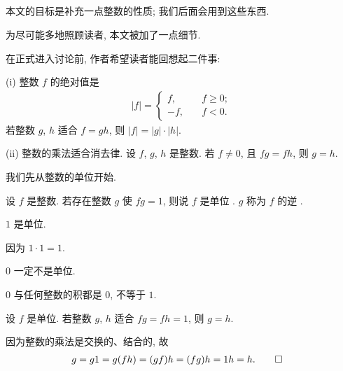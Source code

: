 \subsection*{\SomePropertiesOfIntegers}
\markright{\SomePropertiesOfIntegers}

本文的目标是补充一点整数的性质; 我们后面会用到这些东西.

为尽可能多地照顾读者, 本文被加了一点细节.

在正式进入讨论前, 作者希望读者能回想起二件事:

(i) 整数 $f$ 的绝对值是
\begin{align*}
    |f| = \begin{cases}
        f,  & \quad f \geq 0; \\
        -f, & \quad f < 0.
    \end{cases}
\end{align*}
若整数 $g$, $h$ 适合 $f = gh$, 则 $|f| = |g| \cdot |h|$.

(ii) 整数的乘法适合消去律. 设 $f$, $g$, $h$ 是整数. 若 $f \neq 0$, 且 $fg = fh$, 则 $g = h$.

我们先从整数的单位开始.

\begin{definition}
    设 $f$ 是整数. 若存在整数 $g$ 使 $fg = 1$, 则说 $f$ 是单位 . $g$ 称为 $f$ 的逆 .
\end{definition}

\begin{proposition}
    $1$ 是单位.
\end{proposition}

\begin{pf}
    因为 $1 \cdot 1 = 1$.
\end{pf}

\begin{proposition}
    $0$ 一定不是单位.
\end{proposition}

\begin{pf}
    $0$ 与任何整数的积都是 $0$, 不等于 $1$.
\end{pf}

\begin{proposition}
    设 $f$ 是单位. 若整数 $g$, $h$ 适合 $fg = fh = 1$, 则 $g = h$.
\end{proposition}

\begin{pf}
    因为整数的乘法是交换的、结合的, 故
    \begin{align*}
         & g = g1 = g(fh) = (gf)h = (fg)h = 1h = h. \qedhere
    \end{align*}
\end{pf}

